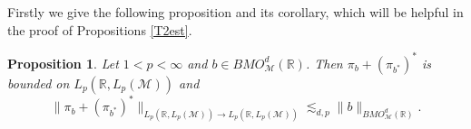 \documentclass[oneside,english,a4wide]{amsart}
\numberwithin{equation}{section}
\numberwithin{figure}{section}
\theoremstyle{plain}
\theoremstyle{plain}
\newtheorem{proposition}[thm]{Proposition}
\theoremstyle{definition}
\theoremstyle{plain}
\theoremstyle{remark}
\theoremstyle{definition}
\theoremstyle{remark}
\theoremstyle{definition}
\newcommand{\8}{\infty}
\begin{document}
Firstly we give the following proposition and its corollary, which will be helpful in the proof of Propositions \ref{T2est}.
\begin{proposition}\label{pibsumpibstar}
	Let $1<p<\infty$ and $b\in BMO^d_\mathcal{M}(\mathbb{R})$. Then $\pi_b+(\pi_{b^*})^*$ is bounded on $L_p(\mathbb{R},L_p(\mathcal{M}))$ and 
	\begin{equation*}
		\|\pi_b+(\pi_{b^*})^*\|_{L_p(\mathbb{R},L_p(\mathcal{M}))\to L_p(\mathbb{R},L_p(\mathcal{M}))}\lesssim_{d, p} \|b\|_{BMO^d_\mathcal{M}(\mathbb{R})}.
	\end{equation*}
\end{proposition}
\end{document}
